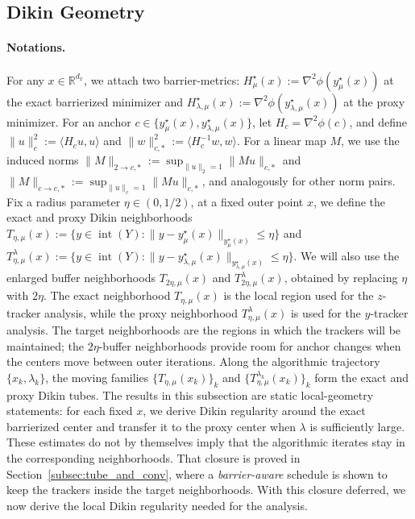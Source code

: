 \documentclass{article}
\begin{document}
\subsection{Dikin Geometry}
\label{subsec:dikin_local}

\paragraph{Notations.} For any \(x\in\mathbb R^{d_x}\), we attach two barrier-metrics:
\(H_\mu^\star(x):=\nabla^2\phi(y_\mu^\star(x))\) at the exact barrierized minimizer and
\(H_{\lambda,\mu}^\star(x):=\nabla^2\phi(y_{\lambda,\mu}^\star(x))\) at the proxy minimizer. For an anchor \(c\in\{y_\mu^\star(x),y_{\lambda,\mu}^\star(x)\}\), let \(H_c=\nabla^2\phi(c)\), and define
\(\|u\|_c^2:=\langle H_cu,u\rangle\) and
\(\|w\|_{c,*}^2:=\langle H_c^{-1}w,w\rangle\). For a linear map \(M\), we use the induced norms
\(\|M\|_{2\to c,*}:=\sup_{\|u\|_2=1}\|Mu\|_{c,*}\) and
\(\|M\|_{c\to c,*}:=\sup_{\|u\|_c=1}\|Mu\|_{c,*}\), and analogously for other norm pairs. Fix a radius parameter \(\eta\in(0,1/2)\), at a fixed outer point \(x\), we define the exact and proxy Dikin neighborhoods
\(T_{\eta,\mu}(x):=\{y\in\operatorname{int}(Y):\|y-y_\mu^\star(x)\|_{y_\mu^\star(x)}\le \eta\}\) and
\(T_{\eta,\mu}^{\lambda}(x):=\{y\in\operatorname{int}(Y):\|y-y_{\lambda,\mu}^\star(x)\|_{y_{\lambda,\mu}^\star(x)}\le \eta\}\).
We will also use the enlarged buffer neighborhoods \(T_{2\eta,\mu}(x)\) and
\(T_{2\eta,\mu}^{\lambda}(x)\), obtained by replacing \(\eta\) with \(2\eta\).
The exact neighborhood \(T_{\eta,\mu}(x)\) is the local region used for the \(z\)-tracker analysis, while the
proxy neighborhood \(T_{\eta,\mu}^{\lambda}(x)\) is used for the \(y\)-tracker analysis. The target neighborhoods are the regions in which the trackers will be maintained; the \(2\eta\)-buffer neighborhoods provide room for anchor changes when the centers
move between outer iterations. Along the algorithmic trajectory \(\{x_k,\lambda_k\}\), the moving families \(\{T_{\eta,\mu}(x_k)\}_k\) and \(\{T_{\eta,\mu}^{\lambda_k}(x_k)\}_k\) form the exact and proxy Dikin tubes. The results in this subsection are static local-geometry
statements: for each fixed \(x\), we derive Dikin regularity around the exact barrierized center and
transfer it to the proxy center when \(\lambda\) is sufficiently large. These estimates do not by
themselves imply that the algorithmic iterates stay in the corresponding neighborhoods. That closure is proved in Section~\ref{subsec:tube_and_conv}, where a \textit{barrier-aware} schedule is shown to
keep the trackers inside the target neighborhoods. With this closure deferred, we now derive the local Dikin regularity needed for the analysis.
\end{document}
